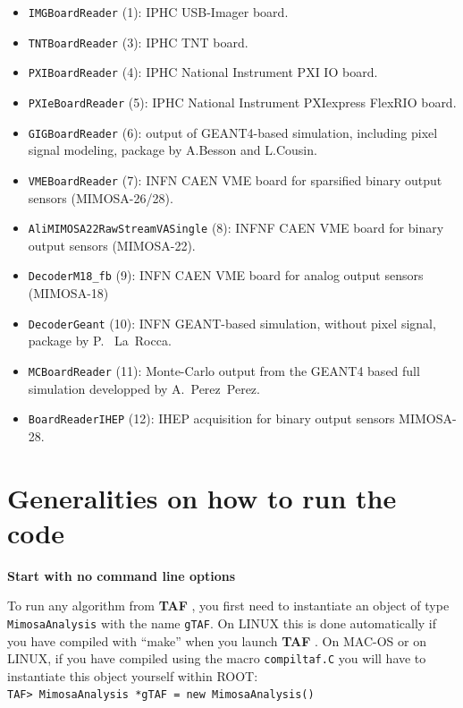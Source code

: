 \documentclass[a4paper, 12pt, twoside]{article}
\newif\ifwithcomment
\newcommand{\comment}[1]{\ifwithcomment {\textcolor{blue}{\it#1}} \fi}
\newcommand{\TAF}{{\bf TAF }}
\begin{document}
\begin{itemize}
\item {\tt IMGBoardReader} (1): IPHC USB-Imager board.
\item {\tt TNTBoardReader} (3): IPHC TNT board.
\item {\tt PXIBoardReader} (4): IPHC National Instrument PXI IO board.
\item {\tt PXIeBoardReader} (5): IPHC National Instrument PXIexpress FlexRIO board.
\item {\tt GIGBoardReader} (6): output of GEANT4-based simulation, including pixel signal modeling, package by A.Besson and L.Cousin.
\item {\tt VMEBoardReader} (7): INFN CAEN VME board for sparsified binary output sensors (MIMOSA-26/28).
\item {\tt AliMIMOSA22RawStreamVASingle} (8): INFNF CAEN VME board for binary output sensors (MIMOSA-22).
\item {\tt DecoderM18\_fb} (9): INFN CAEN VME board for analog output sensors (MIMOSA-18)
\item {\tt DecoderGeant} (10): INFN GEANT-based simulation, without pixel signal, package by P. ~La~Rocca.
\item {\tt MCBoardReader} (11): Monte-Carlo output from the GEANT4 based full simulation developped by A.~Perez~Perez.
\item {\tt BoardReaderIHEP} (12): IHEP acquisition for binary output sensors MIMOSA-28.
\end{itemize}

\comment{Better description of each type would be useful. Especially management of triggers and frames to generate event for PXIeBoardReader is really needed.}

\comment{Operations on rawdata in {\tt DPlane::Update} and {\tt DPlane::Analyze\_{basic}} are still not described. Also the possibility to simulate discrimination is not mentionned.}

\vspace{2cm}

\section{Generalities on how to run the code}
\label{secRunning}

\noindent
{\bf Start with no command line options}

\noindent
To run any algorithm from \TAF, you first need to instantiate an object of type {\tt MimosaAnalysis} with the name {\tt gTAF}. On LINUX this is done automatically if you have compiled with ``make'' when you launch \TAF . On MAC-OS or on LINUX, if you have compiled using the macro {\tt compiltaf.C} you will have to instantiate this object yourself within ROOT:\\
{\tt TAF> MimosaAnalysis *gTAF = new MimosaAnalysis()}\\
\end{document}
